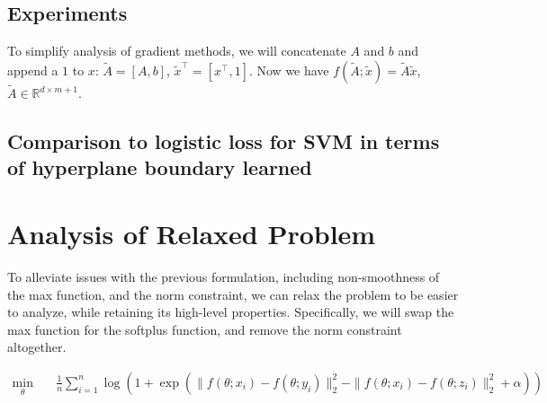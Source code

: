 \documentclass[11pt]{article}
\begin{document}
\subsection{Experiments}




To simplify analysis of gradient methods, we will concatenate $A$ and $b$ and append a $1$ to $x$: $\tilde{A} = [A, b]$, $\tilde{x}^\top = [x^\top, 1]$. Now we have $f(\tilde{A}; \tilde{x}) = \tilde{A} \tilde{x}$, $\tilde{A} \in \mathbb{R}^{d \times m+1}$.

\subsection{Comparison to logistic loss for SVM in terms of hyperplane boundary learned}


\section{Analysis of Relaxed Problem}

To alleviate issues with the previous formulation, including non-smoothness of the max function, and the norm constraint, we can relax the problem to be easier to analyze, while retaining its high-level properties. Specifically, we will swap the max function for the softplus function, and remove the norm constraint altogether.

\begin{equation}
\begin{aligned}
    \min_{\theta} \quad & \frac{1}{n} \sum_{i=1}^{n} \log{(1 + \exp{( \| f(\theta; x_i) - f(\theta; y_i)\|_2^2 - \| f(\theta; x_i) - f(\theta; z_i)\|_2^2 + \alpha)})}
\end{aligned}
\end{equation}
\end{document}
